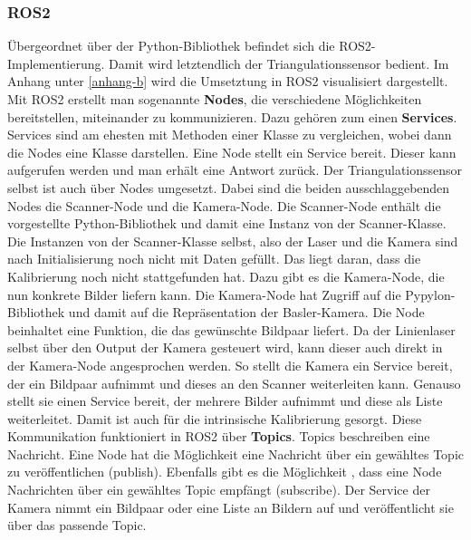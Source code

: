 		\subsubsection{ROS2}
		
		Übergeordnet über der Python-Bibliothek befindet sich die ROS2-Implementierung. Damit wird letztendlich der Triangulationssensor bedient. Im Anhang unter \ref{anhang-b} wird die Umsetztung in ROS2 visualisiert dargestellt. \newline
		Mit ROS2 erstellt man sogenannte \textbf{Nodes}, die verschiedene Möglichkeiten bereitstellen, miteinander zu kommunizieren. Dazu gehören zum einen \textbf{Services}. Services sind am ehesten mit Methoden einer Klasse zu vergleichen, wobei dann die Nodes eine Klasse darstellen. Eine Node stellt ein Service bereit. Dieser kann aufgerufen werden und man erhält eine Antwort zurück. Der Triangulationssensor selbst ist auch über Nodes umgesetzt. Dabei sind die beiden ausschlaggebenden Nodes die Scanner-Node und die Kamera-Node. Die Scanner-Node enthält die vorgestellte Python-Bibliothek und damit eine Instanz von der Scanner-Klasse. Die Instanzen von der Scanner-Klasse selbst, also der Laser und die Kamera sind nach Initialisierung noch nicht mit Daten gefüllt. Das liegt daran, dass die Kalibrierung noch nicht stattgefunden hat. Dazu gibt es die Kamera-Node, die nun konkrete Bilder liefern kann. Die Kamera-Node hat Zugriff auf die Pypylon-Bibliothek und damit auf die Repräsentation der Basler-Kamera. Die Node beinhaltet eine Funktion, die das gewünschte Bildpaar liefert. Da der Linienlaser selbst über den Output der Kamera gesteuert wird, kann dieser auch direkt in der Kamera-Node angesprochen werden. So stellt die Kamera ein Service bereit, der ein Bildpaar aufnimmt und dieses an den Scanner weiterleiten kann. Genauso stellt sie einen Service bereit, der mehrere Bilder aufnimmt und diese als Liste weiterleitet. Damit ist auch für die intrinsische Kalibrierung gesorgt. \newline
		Diese Kommunikation funktioniert in ROS2 über \textbf{Topics}. Topics beschreiben eine Nachricht. Eine Node hat die Möglichkeit eine Nachricht über ein gewähltes Topic zu \linebreak veröffentlichen (publish). Ebenfalls gibt es die Möglichkeit , dass eine Node Nachrichten über ein gewähltes Topic empfängt (subscribe). Der Service der Kamera nimmt ein Bildpaar oder eine Liste an Bildern auf und \linebreak veröffentlicht sie über das passende Topic. \newline
